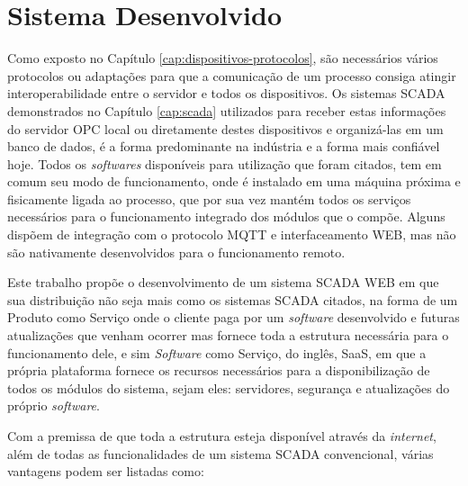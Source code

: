 \chapter{Sistema Desenvolvido}
\label{chap:sistema-desenvolvido}

Como exposto no Capítulo \ref{cap:dispositivos-protocolos}, são necessários vários protocolos ou adaptações para que a comunicação de um processo consiga atingir interoperabilidade entre o servidor e todos os dispositivos. Os sistemas \gls{SCADA} demonstrados no Capítulo \ref{cap:scada} utilizados para receber estas informações do servidor \gls{OPC} local ou diretamente destes dispositivos e organizá-las em um banco de dados, é a forma predominante na indústria e a forma mais confiável hoje. Todos os \textit{softwares} disponíveis para utilização que foram citados, tem em comum seu modo de funcionamento, onde é instalado em uma máquina próxima e fisicamente ligada ao processo, que por sua vez mantém todos os serviços necessários para o funcionamento integrado dos módulos que o compõe. Alguns dispõem de integração com o protocolo \gls{MQTT} e interfaceamento \gls{WEB}, mas não são nativamente desenvolvidos para o funcionamento remoto.

Este trabalho propõe o desenvolvimento de um sistema \gls{SCADA} \gls{WEB} em que sua distribuição não seja mais como os sistemas \gls{SCADA} citados, na forma de um Produto como Serviço onde o cliente paga por um \textit{software} desenvolvido e futuras atualizações que venham ocorrer mas fornece toda a estrutura necessária para o funcionamento dele, e sim \textit{Software} como Serviço, do inglês, \gls{SaaS}, em que a própria plataforma fornece os recursos necessários para a disponibilização de todos os módulos do sistema, sejam eles: servidores, segurança e atualizações do próprio \textit{software}.

Com a premissa de que toda a estrutura esteja disponível através da \textit{internet}, além de todas as funcionalidades de um sistema \gls{SCADA} convencional, várias vantagens podem ser listadas como:

